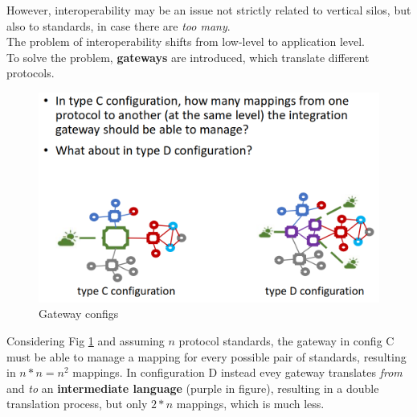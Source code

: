 
However, interoperability may be an issue not strictly related to vertical silos, but also to standards, in case there are \textit{too many}.\\
The problem of interoperability shifts from low-level to application level.\\
To solve the problem, \textbf{gateways} are introduced, which translate different protocols.

\newpage
\begin{figure}[htbp]
   \centering
   \includegraphics{images/gateways_configs.png}
   \caption{Gateway configs}
   \label{fig:gateways_configs}
\end{figure}
Considering Fig \ref{fig:gateways_configs} and assuming $n$ protocol standards, the gateway in config C must be able to manage a mapping for every possible pair of standards,
resulting in $n*n = n^2$ mappings.
In configuration D instead evey gateway translates \textit{from} and \textit{to} an \textbf{intermediate language} ({\color{mauve}purple} in figure), resulting in a double translation process, but only $2*n$ mappings, which is much less.



